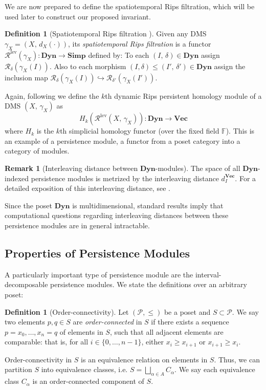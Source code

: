 \documentclass[a4paper,UKenglish,thm-restate]{article}
\theoremstyle{definition}
\newtheorem{definition}[theorem]{Definition}
\newtheorem{remark}[theorem]{Remark}
\def\bdyn{\mathbf{Dyn}}
\def\bvec{\mathbf{Vec}}
\def\bsimp{\mathbf{Simp}}
\begin{document}
        We are now prepared to define the spatiotemporal Rips filtration, which will be used later to construct our proposed invariant.


        \begin{definition}[Spatiotemporal Rips filtration \cite{spatiotemporal}]
            Given any DMS $\gamma_X=(X,\,d_X(\cdot))$, its \emph{spatiotemporal Rips filtration} is a functor $\mathcal{R}^{\mathrm{lev}}(\gamma_X):\mathbf{Dyn}\to\bsimp$ defined by: To each $(I,\,\delta)\in\mathbf{Dyn}$ assign $\mathcal{R}_\delta(\gamma_X(I))$. Also to each morphism $(I,\delta)\leq(I',\,\delta')\in\mathbf{Dyn}$ assign the inclusion map $\mathcal{R}_\delta(\gamma_X(I))\hookrightarrow\mathcal{R}_{\delta'}(\gamma_X(I'))$. 
        \end{definition}

        Again, following \cite{spatiotemporal} we define the $k$th dynamic Rips persistent homology module of a DMS $(X,\,\gamma_X)$ as \[H_k(\mathcal{R}^\mathrm{lev}(X,\,\gamma_X)): \bdyn \to \bvec\] where $H_k$ is the $k$th simplicial homology functor (over the fixed field $\mathbb{F}$). This is an example of a persistence module, a functor from a poset category into a category of modules. 

        \begin{remark}[Interleaving distance between $\bdyn$-modules] \label{rem:dyninterleavingdistance}
            The space of all $\bdyn$-indexed persistence modules is metrized by the interleaving distance $d_I^{\bvec}$. For a detailed exposition of this interleaving distance, see \cite[Section 4.1]{spatiotemporal}.
        \end{remark}

        Since the poset $\mathbf{Dyn}$ is multidimensional, standard results \cite{multiparamhard} imply that computational questions regarding interleaving distances between these persistence modules are in general intractable.

\subsection{Properties of Persistence Modules}

    A particularly important type of persistence module are the interval-decomposable persistence modules. We state the definitions over an arbitrary poset:

    \begin{definition}[Order-connectivity]
        Let $(\mathcal{P}, \leq)$ be a poset and $S \subset \mathcal{P}$. We say two elements $p, q \in S$ are \emph{order-connected} in $S$ if there exists a sequence $p = x_0, \ldots, x_n = q$ of elements in $S$, such that all adjacent elements are comparable: that is, for all $i \in \{0, \ldots, n-1\}$, either $x_i \geq x_{i+1}$ or $x_{i+1} \geq x_i$.
        
        Order-connectivity in $S$ is an equivalence relation on elements in $S$. Thus, we can partition $S$ into equivalence classes, i.e. $S = \bigsqcup_{\alpha \in A} C_{\alpha}$. We say each equivalence class $C_{\alpha}$ is an order-connected component of $S$.
    \end{definition}
    
\end{document}
